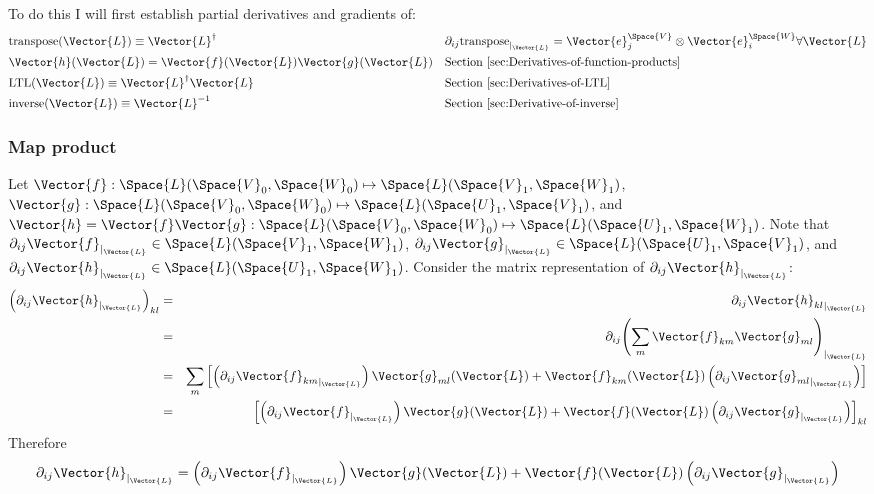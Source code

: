 To do this I will first establish partial derivatives and gradients of:
\begin{equation}
\begin{aligned}
\label{eq:transpose-derivative}
&\Transpose(\Vector{L}) \equiv \Vector{L}^{\dagger}
&&\db{ij}{\Transpose}{\Vector{L}} =  \Vector{e}_j^{\Space{V}} \otimes \Vector{e}_i^{\Space{W}}
\forall \Vector{L}
\\
&\Vector{h}( \Vector{L} ) = \Vector{f} ( \Vector{L} ) \Vector{g} ( \Vector{L} )
&&\text{Section \ref{sec:Derivatives-of-function-products} }
\\
&\LTL(\Vector{L}) \equiv \Vector{L}^{\dagger} \Vector{L}
&&\text{Section \ref{sec:Derivatives-of-LTL} }
\\
&\Inverse(\Vector{L}) \equiv \Vector{L}^{-1}
&&\text{Section \ref{sec:Derivative-of-inverse} }
\end{aligned}
\end{equation}


\subsubsection{Map product}
\label{sec:Derivatives-of-function-products}

Let
$\Vector{f} : \Space{L}(\Space{V}_0,\Space{W}_0) \mapsto \Space{L}(\Space{V}_1,\Space{W}_1)$,
$\Vector{g} : \Space{L}(\Space{V}_0,\Space{W}_0) \mapsto \Space{L}(\Space{U}_1,\Space{V}_1)$,
and
$\Vector{h} = \Vector{f}\Vector{g} : \Space{L}(\Space{V}_0,\Space{W}_0) \mapsto \Space{L}(\Space{U}_1,\Space{W}_1)$.
Note that
$\db{ij}{\Vector{f}}{\Vector{L}} \in  \Space{L}(\Space{V}_1,\Space{W}_1)$,
$\db{ij}{\Vector{g}}{\Vector{L}} \in  \Space{L}(\Space{U}_1,\Space{V}_1)$,
and
$\db{ij}{\Vector{h}}{\Vector{L}} \in  \Space{L}(\Space{U}_1,\Space{W}_1)$.
Consider the matrix representation of $\db{ij}{\Vector{h}}{\Vector{L}}$:
\begin{eqnarray}
\left( \db{ij}{\Vector{h}}{\Vector{L}} \right)_{kl}
& = &
\db{ij}{\Vector{h}_{kl}}{\Vector{L}}
\\
& = &
\db{ij}{\left( \sum_{m} \Vector{f}_{km} \Vector{g}_{ml} \right)}{\Vector{L}}
\nonumber
\\
& = &
\sum_{m}  \left[
\left( \db{ij}{\Vector{f}_{km}}{\Vector{L}} \right) \Vector{g}_{ml}(\Vector{L})
+
\Vector{f}_{km}(\Vector{L}) \left( \db{ij}{\Vector{g}_{ml}}{\Vector{L}} \right)
\right]
\nonumber
\\
& = &
\left[
\left( \db{ij}{\Vector{f}}{\Vector{L}} \right) \Vector{g}(\Vector{L})
+
\Vector{f}(\Vector{L}) \left( \db{ij}{\Vector{g}}{\Vector{L}} \right)
\right]_{kl}
\nonumber
\end{eqnarray}
Therefore
\begin{equation}
\label{eq:map-product-derivative}
\db{ij}{\Vector{h}}{\Vector{L}}
 =
\left( \db{ij}{\Vector{f}}{\Vector{L}} \right) \Vector{g}(\Vector{L})
+
\Vector{f}(\Vector{L}) \left( \db{ij}{\Vector{g}}{\Vector{L}} \right)
\end{equation}


